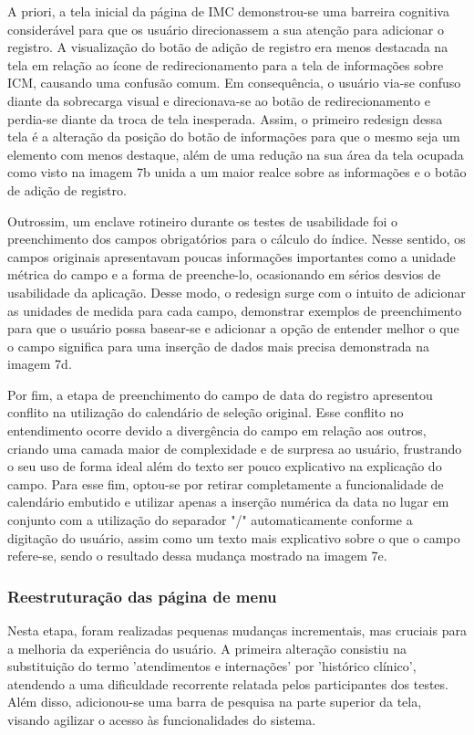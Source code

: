 \documentclass[12pt]{article}
\begin{document}
\begin{abstractp}
 A priori, a tela inicial da página de IMC demonstrou-se uma barreira cognitiva considerável para que os usuário direcionassem a sua atenção para adicionar o registro. A visualização do botão de adição de registro era menos destacada na tela em relação ao ícone de redirecionamento para a tela de informações sobre ICM, causando uma confusão comum. Em consequência, o usuário via-se confuso diante da sobrecarga visual e direcionava-se ao botão de redirecionamento e perdia-se diante da troca de tela inesperada. Assim, o primeiro redesign dessa tela é a alteração da posição do botão de informações para que o mesmo seja um elemento com menos destaque, além de uma redução na sua área da tela ocupada como visto na imagem 7b unida a um maior realce sobre as informações e o botão de adição de registro.

 Outrossim, um enclave rotineiro durante os testes de usabilidade foi o preenchimento dos campos obrigatórios para o cálculo do índice. Nesse sentido, os campos originais apresentavam poucas informações importantes como a unidade métrica do campo e a forma de preenche-lo, ocasionando em sérios desvios de usabilidade da aplicação. Desse modo, o redesign surge com o intuito de adicionar as unidades de medida para cada campo, demonstrar exemplos de preenchimento para que o usuário possa basear-se e adicionar a opção de entender melhor o que o campo significa para uma inserção de dados mais precisa demonstrada na imagem 7d.

 Por fim, a etapa de preenchimento do campo de data do registro apresentou conflito na utilização do calendário de seleção original. Esse conflito no entendimento ocorre devido a divergência do campo em relação aos outros, criando uma camada maior de complexidade e de surpresa ao usuário, frustrando o seu uso de forma ideal além do texto ser pouco explicativo na explicação do campo. Para esse fim, optou-se por retirar completamente a funcionalidade de calendário embutido e utilizar apenas a inserção numérica da data no lugar em conjunto com a utilização do separador "/" automaticamente conforme a digitação do usuário, assim como um texto mais explicativo sobre o que o campo refere-se, sendo o resultado dessa mudança mostrado na imagem 7e.

 \subsubsection{Reestruturação das página de menu}
Nesta etapa, foram realizadas pequenas mudanças incrementais, mas cruciais para a melhoria da experiência do usuário. A primeira alteração consistiu na substituição do termo 'atendimentos e internações' por 'histórico clínico', atendendo a uma dificuldade recorrente relatada pelos participantes dos testes. Além disso, adicionou-se uma barra de pesquisa na parte superior da tela, visando agilizar o acesso às funcionalidades do sistema.


\end{abstractp}
\end{document}
